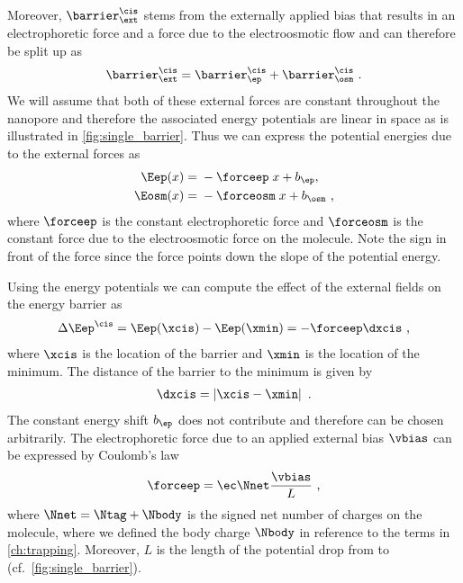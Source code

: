 Moreover, $\barrier^\cis_\ext$ stems from the externally applied bias that results in an electrophoretic force
and a force due to the electroosmotic flow and can therefore be split up as
%
\begin{align}\label{eq:barrier_ext}
    \barrier^\cis_\ext = \barrier^\cis_\ep + \barrier^\cis_\osm
    \text{ .}
\end{align}
%
We will assume that both of these external forces are constant throughout the nanopore and therefore the
associated energy potentials are linear in space as is illustrated in \cref{fig:single_barrier}. Thus we can
express the potential energies due to the external forces as
%
\begin{align*}
    \Eep(x)   ={}& -\forceep \;x + b_{\ep},\\
    \Eosm(x)  ={}& -\forceosm\; x + b_{\osm}
    \text{ ,}
\end{align*}
%
where $\forceep$ is the constant electrophoretic force and $\forceosm$ is the constant force due to the
electroosmotic force on the molecule. Note the sign in front of the force since the force points down the
slope of the potential energy.

Using the energy potentials we can compute the effect of the external fields on the energy barrier as
%
\begin{align*}
    \Delta \Eep^\cis = \Eep(\xcis) - \Eep(\xmin)
    = - \forceep \dxcis
    \text{ ,}
\end{align*}
%
where $\xcis$ is the location of the barrier and $\xmin$ is the location of the minimum. The distance of the
barrier to the minimum is given by
%
\begin{align*}
    \dxcis = \left|\xcis - \xmin\right|
    \text{ .}
\end{align*}
%
The constant energy shift $b_{\ep}$ does not contribute and therefore can be chosen arbitrarily. The
electrophoretic force due to an applied external bias $\vbias$ can be expressed by Coulomb's law
%
\begin{align}\label{eq:forceep}
    \forceep = \ec \Nnet   \frac{\vbias}{L}
    \text{ ,}
\end{align}
%
where $\Nnet = \Ntag +\Nbody$ is the signed net number of charges on the molecule, where we defined the body
charge $\Nbody$ in reference to the terms in \cref{ch:trapping}. Moreover, $L$ is the length of the potential
drop from \cisi{} to \transi{} (cf.~\cref{fig:single_barrier}).


